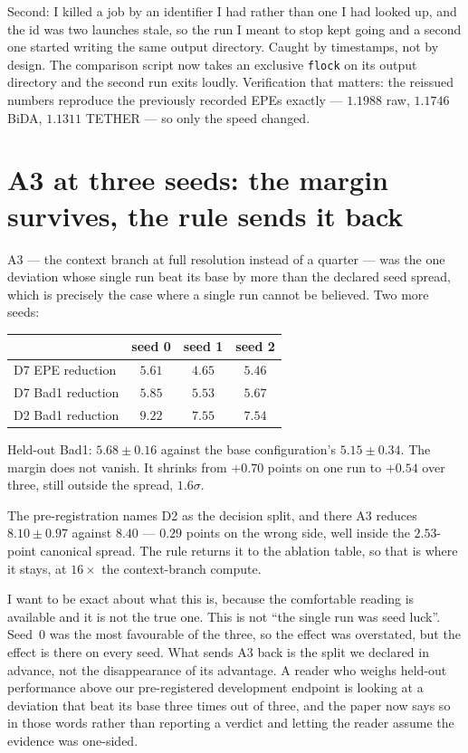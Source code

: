 \documentclass[11pt,a4paper]{article}
\begin{document}
Second: I killed a job by an identifier I had rather than one I had looked up, and
the id was two launches stale, so the run I meant to stop kept going and a second
one started writing the same output directory. Caught by timestamps, not by design.
The comparison script now takes an exclusive \texttt{flock} on its output directory
and the second run exits loudly. Verification that matters: the reissued numbers
reproduce the previously recorded EPEs exactly --- $1.1988$ raw, $1.1746$ BiDA,
$1.1311$ TETHER --- so only the speed changed.


\section*{A3 at three seeds: the margin survives, the rule sends it back}

A3 --- the context branch at full resolution instead of a quarter --- was the one
deviation whose single run beat its base by more than the declared seed spread, which
is precisely the case where a single run cannot be believed. Two more seeds:

\begin{center}
\begin{tabular}{lccc}
\toprule
& seed 0 & seed 1 & seed 2 \\
\midrule
D7 EPE reduction  & $5.61$ & $4.65$ & $5.46$ \\
D7 Bad1 reduction & $5.85$ & $5.53$ & $5.67$ \\
D2 Bad1 reduction & $9.22$ & $7.55$ & $7.54$ \\
\bottomrule
\end{tabular}
\end{center}

Held-out Bad1: $5.68\pm0.16$ against the base configuration's $5.15\pm0.34$. The
margin does not vanish. It shrinks from $+0.70$ points on one run to $+0.54$ over
three, still outside the spread, $1.6\sigma$.

The pre-registration names D2 as the decision split, and there A3 reduces
$8.10\pm0.97$ against $8.40$ --- $0.29$ points on the wrong side, well inside the
$2.53$-point canonical spread. The rule returns it to the ablation table, so that is
where it stays, at $16\times$ the context-branch compute.

I want to be exact about what this is, because the comfortable reading is available
and it is not the true one. This is not ``the single run was seed luck''. Seed~0 was
the most favourable of the three, so the effect was overstated, but the effect is
there on every seed. What sends A3 back is the split we declared in advance, not the
disappearance of its advantage. A reader who weighs held-out performance above our
pre-registered development endpoint is looking at a deviation that beat its base
three times out of three, and the paper now says so in those words rather than
reporting a verdict and letting the reader assume the evidence was one-sided.
\end{document}
